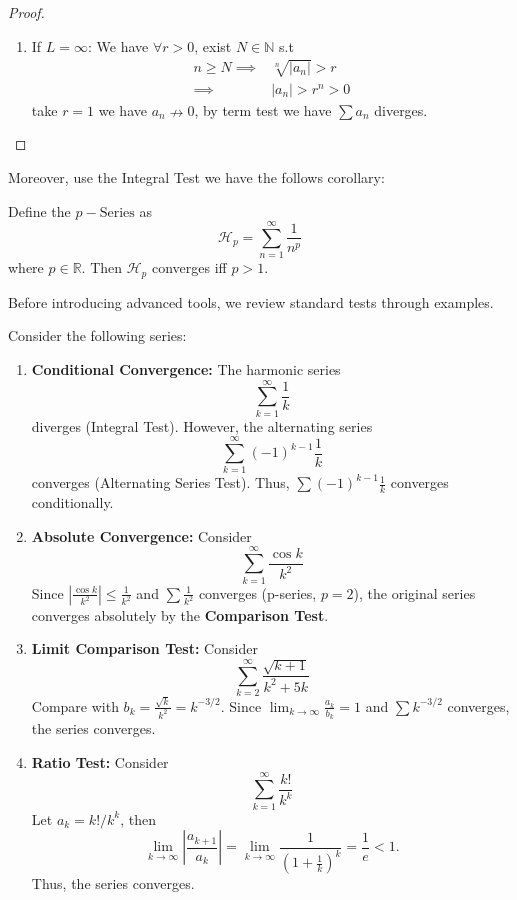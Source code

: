 \documentclass[
	UTF-8,
	11pt, %
	a4paper, %
]{LegrandOrangeBook}
\begin{document}
\begin{proof}
\begin{enumerate}
            \item If $L = \infty$: We have $\forall r >0$, exist $N \in \mathbb{N}$ s.t 
            \begin{align*}
            n \geq N \implies&  \sqrt[n]{|a_n|} > r \\
            \implies&  |a_n| > r^n >0
            \end{align*}
            take $r = 1$ we have $a_n \nrightarrow 0$, 
            by term test we have $\sum a_n$ diverges.
        \end{enumerate}
    \end{proof}

    \newpage

    Moreover, use the Integral Test we have the follows corollary:

    \newcommand{\pseries}[1]{\mathcal{H}_{#1}}

    \begin{corollary}
        Define the $p-\text{Series}$ as 
        $$
        \pseries{p} = \sum_{n=1}^{\infty} \dfrac{1}{n^p}
        $$
        where $p \in \mathbb{R}$. Then $\pseries{p}$ converges iff $p>1$.
    \end{corollary}

    Before introducing advanced tools, we review standard tests through examples.

    \begin{example}
    Consider the following series:
    \begin{enumerate}
        \item \textbf{Conditional Convergence:} 
        The harmonic series 
        $$\sum_{k=1}^\infty \frac{1}{k}$$
        diverges (Integral Test). 
        However, the alternating series 
        $$\sum_{k=1}^\infty (-1)^{k-1} \frac{1}{k}$$ 
        converges (Alternating Series Test).
        Thus, $\sum (-1)^{k-1} \frac{1}{k}$ converges conditionally.

        \item \textbf{Absolute Convergence:}
        Consider
        $$\sum_{k=1}^\infty \frac{\cos k}{k^2}$$ 
        Since $|\frac{\cos k}{k^2}| \le \frac{1}{k^2}$ and $\sum \frac{1}{k^2}$ converges (p-series, $p=2$), 
        the original series converges absolutely by the \textbf{Comparison Test}.

        \item \textbf{Limit Comparison Test:} Consider
        $$\sum_{k=2}^\infty \frac{\sqrt{k+1}}{k^2+5k}$$
        Compare with $b_k = \frac{\sqrt{k}}{k^2} = k^{-3/2}$.
        Since $\lim_{k \to \infty} \frac{a_k}{b_k} = 1$ and $\sum k^{-3/2}$ converges, the series converges.

        \item \textbf{Ratio Test:} Consider
        $$\sum_{k=1}^\infty \frac{k!}{k^k}$$
        Let $a_k = k!/k^k$, then
        \[ \lim_{k \to \infty} \left| \frac{a_{k+1}}{a_k} \right| = \lim_{k \to \infty} \frac{1}{(1 + \frac{1}{k})^k} = \frac{1}{e} < 1. \]
        Thus, the series converges.
    \end{enumerate}
    \end{example}
\end{document}
